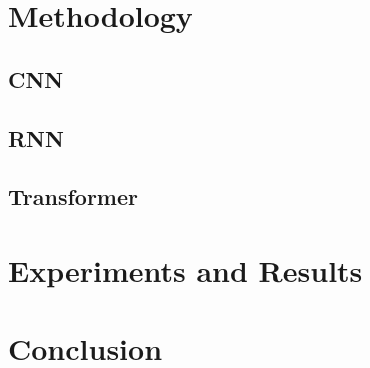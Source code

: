 \documentclass[11pt]{article}
\begin{document}
	\section{Methodology} \label{sec:meth}
	
	\subsection{CNN}
	
	\subsection{RNN}
	
	\subsection{Transformer}
	
	
	
	\section{Experiments and Results} \label{sec:exp}
	
	\section{Conclusion} \label{sec:conc}
	
	
	
\end{document}
